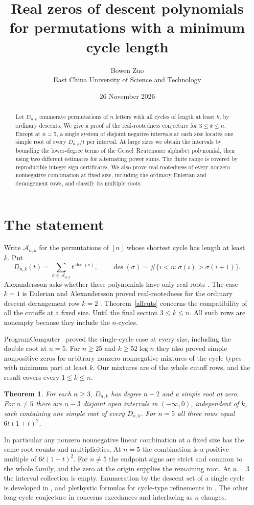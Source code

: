 \documentclass[11pt]{article}
\title{Real zeros of descent polynomials for permutations with a minimum cycle length}
\author{Bowen Zuo\\ {\small East China University of Science and Technology}}
\date{26 November 2026}
\newtheorem{theorem}{Theorem}
\DeclareMathOperator{\des}{des}
\begin{document}
\maketitle
\begin{abstract}
Let $D_{n,k}$ enumerate permutations of $n$ letters with all cycles of length at least $k$, by ordinary descents. We give a proof of the real-rootedness conjecture for $3\le k\le n$. Except at $n=5$, a single system of disjoint negative intervals at each size locates one simple root of every $D_{n,k}/t$ per interval. At large sizes we obtain the intervals by bounding the lower-degree terms of the Gessel--Reutenauer alphabet polynomial, then using two different estimates for alternating power sums. The finite range is covered by reproducible integer sign certificates. We also prove real-rootedness of every nonzero nonnegative combination at fixed size, including the ordinary Eulerian and derangement rows, and classify its multiple roots.
\end{abstract}

\section{The statement}
Write $\mathcal A_{n,k}$ for the permutations of $[n]$ whose shortest cycle has length at least $k$. Put
\[
 D_{n,k}(t)=\sum_{\sigma\in\mathcal A_{n,k}}t^{\des(\sigma)},\qquad
 \des(\sigma)=\#\{i<n:\sigma(i)>\sigma(i+1)\}.
\]
Alexandersson asks whether these polynomials have only real roots \cite{open}. The case $k=1$ is Eulerian and Alexandersson proved real-rootedness for the ordinary descent derangement row $k=2$ \cite[Theorem~2.1]{der}. Theorem~\ref{allcuts} concerns the compatibility of all the cutoffs at a fixed size. Until the final section $3\le k\le n$. All such rows are nonempty because they include the $n$-cycles.

ProgramComputer~\cite{pc} proved the single-cycle case at every size,
including the double root at $n=5$. For $n\ge25$ and $k\ge52\log n$
they also proved simple nonpositive zeros for arbitrary nonzero
nonnegative mixtures of the cycle types with minimum part at least $k$.
Our mixtures are of the whole cutoff rows, and the result covers every
$1\le k\le n$.

\begin{theorem}\label{main}
For each $n\ge3$, $D_{n,k}$ has degree $n-2$ and a simple root at zero. For $n\ne5$ there are $n-3$ disjoint open intervals in $(-\infty,0)$, independent of $k$, each containing one simple root of every $D_{n,k}$. For $n=5$ all three rows equal $6t(1+t)^2$.
\end{theorem}
In particular any nonzero nonnegative linear combination at a fixed size has the same root counts and multiplicities. At $n=5$ the combination is a positive multiple of $6t(1+t)^2$. For $n\ne5$ the endpoint signs are strict and common to the whole family, and the zero at the origin supplies the remaining root. At $n=3$ the interval collection is empty. Enumeration by the descent set of a single cycle is developed in \cite{et}, and plethystic formulas for cycle-type refinements in \cite{gz}. The other long-cycle conjecture in \cite{open} concerns excedances and interlacing as $n$ changes.
\end{document}
